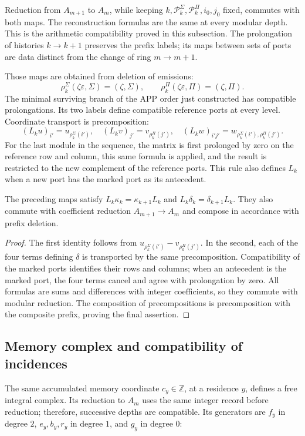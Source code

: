 Reduction from \(A_{m+1}\) to \(A_m\), while keeping
\(k,\mathscr P_k^\Sigma,\mathscr P_k^\Pi,i_0,j_0\) fixed, commutes with both
maps. The reconstruction formulas are the same at every modular
depth. This is the arithmetic compatibility proved in this subsection. The
prolongation of histories \(k\to k+1\) preserves the prefix labels; its
maps between sets of ports are data distinct from the change of
ring \(m\to m+1\).

Those maps are obtained from deletion of emissions:
\[
\rho_k^\Sigma(\zeta\varepsilon,\Sigma)=(\zeta,\Sigma),\qquad
\rho_k^\Pi(\zeta\varepsilon,\Pi)=(\zeta,\Pi).
\]
The minimal surviving branch of the APP order just constructed has compatible prolongations. Its two labels define compatible reference ports at every level. Coordinate transport is precomposition:
\[
(L_ku)_{i'}=u_{\rho_k^\Sigma(i')},\quad
(L_kv)_{j'}=v_{\rho_k^\Pi(j')},\quad
(L_kw)_{i'j'}=w_{\rho_k^\Sigma(i'),\rho_k^\Pi(j')}.
\]
For the last module in the sequence, the matrix is first prolonged by zero on the reference row and column, this same formula is applied, and the result is restricted to the new complement of the reference ports. This rule also defines \(L_k\) when a new port has the marked port as its antecedent.

\begin{proposition}
\label{act21:iv:rectangular-natural}
The preceding maps satisfy
\(L_k\kappa_k=\kappa_{k+1}L_k\) and
\(L_k\delta_k=\delta_{k+1}L_k\).
They also commute with coefficient reduction
\(A_{m+1}\to A_m\) and compose in accordance with prefix deletion.
\end{proposition}
\begin{proof}
The first identity follows from
\(u_{\rho_k^\Sigma(i')}-v_{\rho_k^\Pi(j')}\).
In the second, each of the four terms defining \(\delta\)
is transported by the same precomposition. Compatibility of the
marked ports identifies their rows and columns; when an antecedent is
the marked port, the four terms cancel and agree with
prolongation by zero. All formulas are sums and differences with
integer coefficients, so they commute with modular reduction.
The composition of precompositions is precomposition with the
composite prefix, proving the final assertion.
\end{proof}

\subsection{Memory complex and compatibility of incidences}
The same accumulated memory coordinate \(c_y\in\mathbb Z\), at a residence \(y\), defines a free integral complex. Its reduction to \(A_m\) uses the same integer record before reduction; therefore, successive depths are compatible. Its generators are \(f_y\) in degree \(2\), \(e_y,b_y,r_y\) in degree \(1\), and \(g_y\) in degree \(0\):

